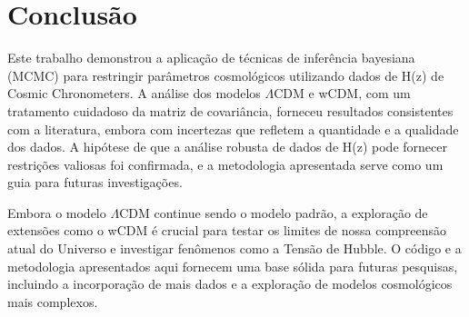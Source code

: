\documentclass{article}
\begin{document}
\section{Conclusão}

Este trabalho demonstrou a aplicação de técnicas de inferência bayesiana (MCMC) para restringir parâmetros cosmológicos utilizando dados de H(z) de Cosmic Chronometers. A análise dos modelos $\Lambda$CDM e wCDM, com um tratamento cuidadoso da matriz de covariância, forneceu resultados consistentes com a literatura, embora com incertezas que refletem a quantidade e a qualidade dos dados. A hipótese de que a análise robusta de dados de H(z) pode fornecer restrições valiosas foi confirmada, e a metodologia apresentada serve como um guia para futuras investigações.

Embora o modelo $\Lambda$CDM continue sendo o modelo padrão, a exploração de extensões como o wCDM é crucial para testar os limites de nossa compreensão atual do Universo e investigar fenômenos como a Tensão de Hubble. O código e a metodologia apresentados aqui fornecem uma base sólida para futuras pesquisas, incluindo a incorporação de mais dados e a exploração de modelos cosmológicos mais complexos.



\end{document}
